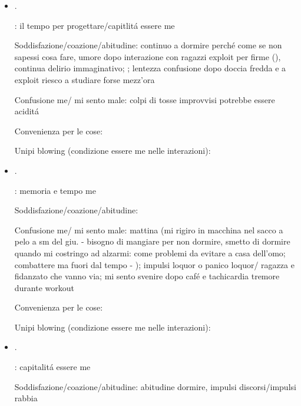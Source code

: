 \begin{itemize}
Confusione me/ mi sento male: dopèo pranzo e dopo cena mi sento stanco con cerchio alla testa; affanno durante workout: iperventilazione?, battiti: cuore arterie come movimenti intestinali

Convenienza per le cose: senso di frustrazione per lentezza studio ASD

Unipi blowing (condizione essere me nelle interazioni):

\item {}.

: il tempo per progettare/capitlit\'a essere me

Soddisfazione/coazione/abitudine: continuo a dormire perch\'e come se non sapessi cosa fare, umore dopo interazione con ragazzi exploit per firme (), continua delirio immaginativo; ; lentezza confusione dopo doccia fredda e a exploit riesco a studiare forse mezz'ora

Confusione me/ mi sento male: colpi di tosse improvvisi potrebbe essere acidit\'a

Convenienza per le cose:

Unipi blowing (condizione essere me nelle interazioni):

\item {}.

: memoria e tempo me

Soddisfazione/coazione/abitudine:

Confusione me/ mi sento male: mattina (mi rigiro in macchina nel sacco a pelo a sm del giu. - bisogno di mangiare per non dormire, smetto di dormire quando mi costringo ad alzarmi: come problemi da evitare a casa dell'omo; combattere ma fuori dal tempo - ); impulsi loquor o panico loquor/ ragazza e fidanzato che vanno via; mi sento svenire dopo caf\'e e tachicardia tremore durante workout

Convenienza per le cose:

Unipi blowing (condizione essere me nelle interazioni):

\item {}.

: capitalit\'a essere me

Soddisfazione/coazione/abitudine: abitudine dormire, impulsi discorsi/impulsi rabbia


\end{itemize}
